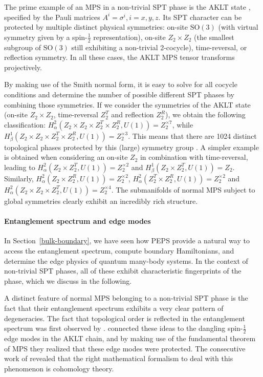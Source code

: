 \documentclass[rmp,aps,reprint,superscriptaddress,nobalancelastpage]{revtex4-1}
\newcommand{\SO}{\mathrm{SO}}
\begin{document}
The prime example of an MPS in a non-trivial SPT phase is the AKLT state \cite{affleck:aklt-cmp}, specified by the Pauli matrices $A^i=\sigma^i, i=x,y,z$. Its SPT character can be protected by multiple distinct physical symmetries: on-site $\SO(3)$ (with virtual symmetry given by a spin-$\tfrac12$ representation), on-site $Z_2\times Z_2$ (the smallest subgroup of $\SO(3)$ still exhibiting a non-trivial 2-cocycle), time-reversal, or reflection symmetry. In all these cases, the AKLT MPS tensor transforms projectively.

By making use of the Smith normal form, it is easy to solve for all cocycle conditions and determine the number of possible different SPT phases by combining those symmetries. If we consider the symmetries of the AKLT state (on-site $Z_2\times Z_2$, time-reversal $Z_2^T$ and reflection $Z_2^R$), we obtain the following classification: $H^2_\alpha(Z_2\times Z_2\times Z_2^T\times Z_2^R,U(1))=Z_2^{\times 7}$, while $H^1_\beta(Z_2\times Z_2\times Z_2^T\times Z_2^R,U(1))=Z_2^{\times 3}$. This means that there are 1024 distinct topological phases protected by this (large) symmetry group \cite{chen2011complete}. A simpler example is obtained when considering an on-site $Z_2$ in combination with time-reversal, leading to
$H^2_\alpha(Z_2\times Z_2^T,U(1))=Z_2^{\times 2}$ and $H^1_\beta(Z_2\times Z_2^T,U(1))=Z_2$. Similarly, $H^2_\alpha(Z_2\times Z_2^R,U(1))=Z_2^{\times 2}$,  $H^2_\alpha(Z_2^T\times Z_2^R,U(1))=Z_2^{\times 2}$ and $H^2_\alpha(Z_2\times Z_2\times Z_2^T,U(1))=Z_2^{\times 4}$. The submanifolds of normal MPS subject to global symmetries clearly exhibit an incredibly rich structure.


\paragraph{Entanglement spectrum and edge modes}

In Section~\ref{bulk-boundary}, we have seen how PEPS provide a natural way to access the entanglement spectrum, compute boundary Hamiltonians, and determine the edge physics of quantum many-body systems. In the context of non-trivial SPT phases, all of these exhibit characteristic fingerprints of the phase, which we discuss in the following.

A distinct feature of normal MPS belonging to a non-trivial SPT phase is the fact that their entanglement spectrum exhibits a very clear pattern of degeneracies. The fact that topological order is reflected in the entanglement spectrum was first observed by \citet*{li:es-qhe-sphere}. \citet{pollmann:symprot-1d} connected these ideas to the dangling spin-$\tfrac12$ edge modes in the AKLT chain, and by making use of the fundamental theorem of MPS they realized that these edge modes were protected. The consecutive work of \citet{chen:spt-order-and-cohomology} revealed that the right mathematical formalism to deal with this phenomenon is cohomology theory.
\end{document}
